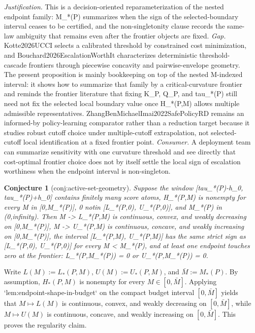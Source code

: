 \documentclass{article}
\newtheorem{conjecture}{Conjecture}
\begin{document}
\par\smallskip\noindent \textit{Justification.} This is a decision-oriented reparameterization of the nested endpoint family: M_*(P) summarizes when the sign of the selected-boundary interval ceases to be certified, and the non-singletonity clause records the same-law ambiguity that remains even after the frontier objects are fixed. \textit{Gap.} Kotte2026UCCI selects a calibrated threshold by constrained cost minimization, and Bouchard2026EscalationWorthIt characterizes deterministic threshold-cascade frontiers through piecewise concavity and pairwise-envelope geometry. The present proposition is mainly bookkeeping on top of the nested M-indexed interval: it shows how to summarize that family by a critical-curvature frontier and reminds the frontier literature that fixing K_P, Q_P, and tau_*(P) still need not fix the selected local boundary value once H_*(P,M) allows multiple admissible representatives. ZhangBenMichaelImai2022SafePolicyRD remains an informed-by policy-learning comparator rather than a reduction target because it studies robust cutoff choice under multiple-cutoff extrapolation, not selected-cutoff local identification at a fixed frontier point. \textit{Consumer.} A deployment team can summarize sensitivity with one curvature threshold and see directly that cost-optimal frontier choice does not by itself settle the local sign of escalation worthiness when the endpoint interval is non-singleton.

\begin{conjecture}[conj:active-set-geometry]\label{conj:active-set-geometry}
Suppose the window [tau_*(P)-h_0, tau_*(P)+h_0] contains finitely many score atoms, H_*(P,M) is nonempty for every M in [0,M_*(P)], 0 notin [L_*(P,0), U_*(P,0)], and M_*(P) in (0,infinity). Then M -> L_*(P,M) is continuous, convex, and weakly decreasing on [0,M_*(P)], M -> U_*(P,M) is continuous, concave, and weakly increasing on [0,M_*(P)], the interval [L_*(P,M), U_*(P,M)] has the same strict sign as [L_*(P,0), U_*(P,0)] for every M < M_*(P), and at least one endpoint touches zero at the frontier: L_*(P,M_*(P)) = 0 or U_*(P,M_*(P)) = 0.
\end{conjecture}
Write \(L(M):=L_*(P,M)\), \(U(M):=U_*(P,M)\), and \(\bar M:=M_*(P)\). By assumption, \(H_*(P,M)\) is nonempty for every \(M\in[0,\bar M]\). Applying `lem:endpoint-shape-in-budget` on the compact budget interval \([0,\bar M]\) yields that \(M\mapsto L(M)\) is continuous, convex, and weakly decreasing on \([0,\bar M]\), while \(M\mapsto U(M)\) is continuous, concave, and weakly increasing on \([0,\bar M]\). This proves the regularity claim.
\end{document}
